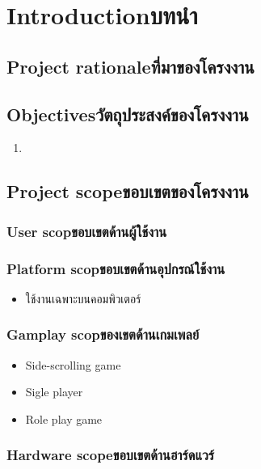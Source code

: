 \chapter{\ifenglish Introduction\else บทนำ\fi}

\section{\ifenglish Project rationale\else ที่มาของโครงงาน\fi}

\section{\ifenglish Objectives\else วัตถุประสงค์ของโครงงาน\fi}
\begin{enumerate}
    \item 
\end{enumerate}

\section{\ifenglish Project scope\else ขอบเขตของโครงงาน\fi}

\subsection{\ifenglish User scop\else ขอบเขตด้านผู้ใช้งาน\fi}

\subsection{\ifenglish Platform scop\else ขอบเขตด้านอุปกรณ์ใช้งาน\fi}
\begin{itemize}
    \item ใช้งานเฉพาะบนคอมพิวเตอร์
\end{itemize}

\subsection{\ifenglish Gamplay scop\else ของเขตด้านเกมเพลย์\fi}
\begin{itemize}
    \item Side-scrolling game
    \item Sigle player
    \item Role play game
\end{itemize}

\subsection{\ifenglish Hardware scope\else ขอบเขตด้านฮาร์ดแวร์\fi}

